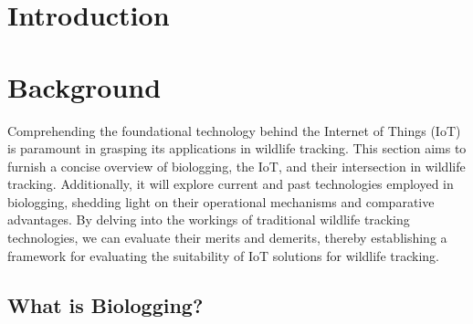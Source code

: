 \documentclass[sigplan,screen,nonacm]{acmart}
\begin{document}
\section{Introduction}
\label{sec:introduction}

\section{Background}
\label{sec:Background}

Comprehending the foundational technology behind the Internet of Things (IoT) 
is paramount in grasping its applications in wildlife tracking. This section 
aims to furnish a concise overview of biologging, the IoT, and their 
intersection in wildlife tracking. Additionally, it will explore current and past 
technologies employed in biologging, shedding light on their operational 
mechanisms and comparative advantages. By delving into the workings of 
traditional wildlife tracking technologies, we can evaluate their merits and 
demerits, thereby establishing a framework for evaluating the suitability of 
IoT solutions for wildlife tracking.

\subsection{What is Biologging?}
\label{subsec:What is Biologging}
\end{document}
